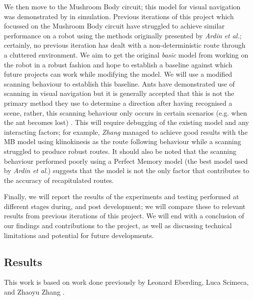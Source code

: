 \documentclass[a4paper,12pt,twoside,openright]{article}
\begin{document}
We then move to the Mushroom Body circuit; this model for visual navigation was demonstrated by
\cite{Ardin2016} in simulation. Previous iterations of this project which focussed on the Mushroom
Body circuit have struggled to achieve similar performance on a robot using the methods originally
presented by \textit{Ardin et al.}; certainly, no previous iteration
has dealt with a non-deterministic route through a cluttered environment. We aim to get the original
\textit{basic} model from \cite{Ardin2016} working on the robot in a robust fashion and hope to
establish a baseline against which future projects can work while modifying the model. We will use
a modified scanning behaviour to establish this baseline. Ants have demonstrated use of scanning in
visual navigation but it is generally accepted that this
is not the primary method they use to determine a direction after having recognised a scene, rather,
this scanning behaviour only occurs in certain scenarios (e.g. when the ant becomes lost)
\cite{Kodzhabashev2015}. This will require debugging of the existing model and any interacting
factors; for example, \textit{Zhang} managed to achieve good results with the MB model using
klinokinesis as the route following behaviour while a scanning struggled to produce robust routes.
It should also be noted that the scanning behaviour performed poorly using a Perfect Memory model \cite{Zhang2017}
(the best model used by \textit{Ardin et al.}) suggests that the model is
not the only factor that contributes to the accuracy of recapitulated routes.
\newline

Finally, we will report the results of the experiments and testing performed at different stages during, and
post development; we will compare these to relevant results from previous iterations of
this project. We will end with a conclusion of our findings and contributions to the project,
as well as discussing technical limitations and potential for future developments.
\newpage

\subsection { Results }
This work is based on work done previously by Leonard Eberding, Luca Scimeca, and Zhaoyu Zhang
\cite{Eberding2016, Scimeca2017, Zhang2017}.
\newline
\end{document}
